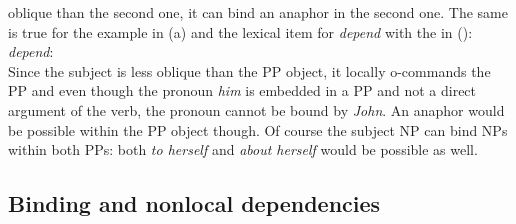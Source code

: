 \documentclass[output=paper,biblatex,babelshorthands,newtxmath,draftmode,colorlinks,citecolor=brown]{langscibook}
\begin{document}
oblique than the second one, it can bind an anaphor in the second one. The same is true for the
example in (a) and the lexical item for \emph{depend} with the \argst in ():
\ea
\emph{depend}:\\
\argst {}
\z
Since the subject is less oblique than the PP object, it locally o-commands
the PP and even though the pronoun \emph{him} is embedded in a PP and not a direct argument of the verb,
the pronoun cannot be bound by \emph{John}. An anaphor would be possible within the PP object though.
Of course the subject NP can bind NPs within both PPs: both \emph{to herself} and \emph{about
  herself} would be possible as well.\label{binding:page-prepositional-objects-end}


\subsection{Binding and nonlocal dependencies}




\end{document}
